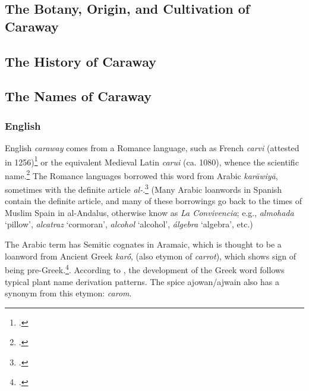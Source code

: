 
\subsection{The Botany, Origin, and  Cultivation of Caraway}

\subsection{The History of Caraway}

\subsection{The Names of Caraway}

\subsubsection{English}





English \textit{caraway} comes from a Romance language, such as  French \textit{carvi} (attested in 1256)\footcite[carvi]{tlfi} or the equivalent Medieval Latin \textit{carui} (ca. 1080), whence the scientific name.\footcites[caraway]{oed}[carvi]{tlfi} The Romance languages borrowed this word from Arabic  \textit{karāwiyā}, sometimes with the definite article \textit{al-}.\footcite{corriente_dictionary_2008} (Many Arabic loanwords in Spanish contain the definite article, and many of these borrowings go back to the times of Muslim Spain in al-Andalus, otherwise know as \textit{La Convivencia}; e.g., \textit{almohada} `pillow', \textit{alcatraz} `cormoran', \textit{alcohol} `alcohol', \textit{álgebra} `algebra', etc.)

The Arabic term has Semitic cognates in Aramaic, which is thought to be a loanword from Ancient Greek  \textit{karṓ}, (also etymon of \textit{carrot}), which shows sign of being pre-Greek.\footcite{beekes_etymological_2010}. According to \textcite{sokoloff_dictionary_2002}, the development of the Greek word follows typical plant name derivation patterns. The spice ajowan/ajwain  also has a synonym from this etymon: \textit{carom}.

